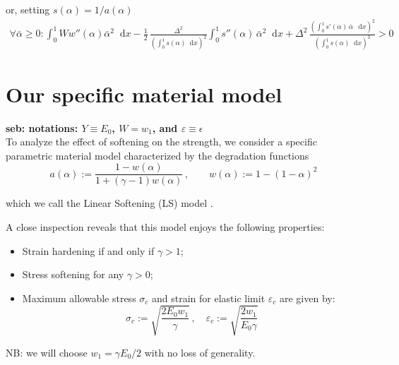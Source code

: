 \documentclass[final,3p,times,authoryear]{elsarticle}
\newcommand{\seb}[1]{{\bf\color{blue} seb: #1 }} %
\renewcommand*\d{\mathop{}\!\mathrm{d}} %
\begin{document}
or, setting $s(\alpha)=1/a(\alpha)$
\begin{align}
\label{eq:second_varia}
\forall \bar{\alpha} \ge0: \int_0^1 W w''(\alpha) \bar{\alpha}^2 \d x -
 \frac12  \, \frac{\Delta^2}{\left( \int_0^1 s(\alpha) \d x \right)^2}
\int_0^1 s''(\alpha) \, \bar{\alpha}^2 \d x
+
\Delta^2 \, \frac{\left( \int_0^1 s'(\alpha) \, \bar{\alpha} \, \d x \right)^2 }{\left( \int_0^1 s(\alpha) \d x \right)^3}
>0
\end{align}





\section{Our specific material model}
\seb{notations: $Y \equiv  E_0$, $W=w_1$, and $\varepsilon \equiv \epsilon$} \\
To analyze the effect of softening on the strength, we consider a specific parametric material model characterized by the degradation functions
\begin{equation}
        a(\alpha) := \frac{1-w(\alpha)}{1 + \left(\gamma-1\right)w(\alpha)} \, ,
        \qquad
        w(\alpha) := 1 - (1-\alpha)^2
    \label{eq:ATK_model}
\end{equation}

which we call the Linear Softening (LS) model \citep{Le2018Strain-gradient}.

A close inspection reveals that this model enjoys the following properties:
\begin{itemize}
    \item Strain hardening if and only if $\gamma>1$; 
    \item Stress softening for any $\gamma>0$;
    \item Maximum allowable stress $\sigma_c$ and strain for elastic limit $\varepsilon_c$ are given by:
\begin{equation}
\sigma_c:=\sqrt{\dfrac{2E_0 w_1 }{\gamma}}
\, , \quad
\varepsilon_c:=\sqrt{\dfrac{2 w_1 }{E_0 \gamma}}
\label{eq:criticalstress}
\end{equation}
\end{itemize}
NB: we will choose $w_1 = \gamma E_0 / 2$ with no loss of generality.
%
%
%
\end{document}
